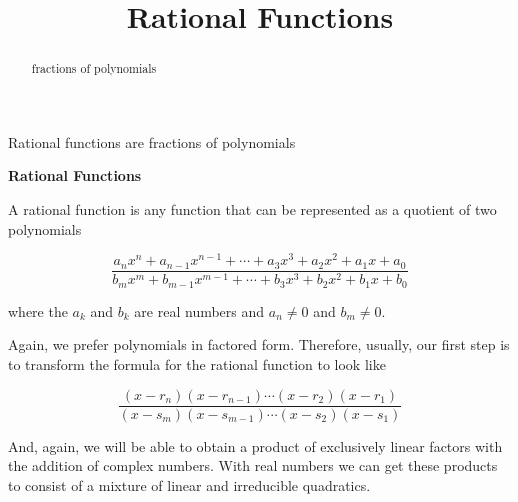 \documentclass{ximera}
\title{Rational Functions}
\begin{document}
\begin{abstract}
fractions of polynomials
\end{abstract}
\maketitle








Rational functions are fractions of polynomials


\begin{definition}\textbf{\textcolor{green!50!black}{Rational Functions}}

A rational function is any function that can be represented as a quotient of two polynomials 

\[   \frac{ a_n x^n + a_{n-1} x^{n-1} + \cdots + a_3 x^3 + a_2 x^2 + a_1 x + a_0  } { b_m x^m + b_{m-1} x^{m-1} + \cdots + b_3 x^3 + b_2 x^2 + b_1 x + b_0 }   \]



where the $a_k$ and $b_k$ are real numbers and $a_n \ne 0$ and $b_m \ne 0$.





\end{definition}




Again, we prefer polynomials in factored form.  Therefore, usually, our first step is to transform the formula for the rational function to look like



\[   \frac{ (x-r_n)(x-r_{n-1})  \cdots (x-r_2)(x-r_1)  } { (x-s_m)(x-s_{m-1})  \cdots (x-s_2)(x-s_1) }   \]




And, again, we will be able to obtain a product of exclusively linear factors with the addition of complex numbers.  With real numbers we can get these products to consist of a mixture of linear and irreducible quadratics.
\end{document}
